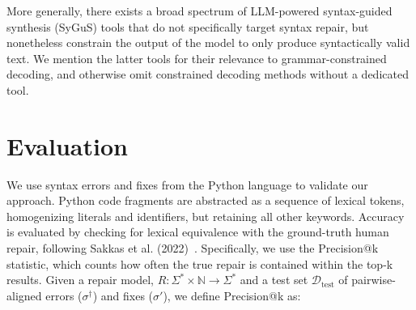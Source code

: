 \documentclass[runningheads]{llncs}
\newcommand{\cmark}{\ding{51}}%
\newcommand{\xmark}{\ding{55}}%
\begin{document}
More generally, there exists a broad spectrum of LLM-powered syntax-guided synthesis (SyGuS) tools that do not specifically target syntax repair, but nonetheless constrain the output of the model to only produce syntactically valid text. We mention the latter tools for their relevance to grammar-constrained decoding, and otherwise omit constrained decoding methods without a dedicated tool.

%


%
%
%

\section{Evaluation}

We use syntax errors and fixes from the Python language to validate our approach. Python code fragments are abstracted as a sequence of lexical tokens, homogenizing literals and identifiers, but retaining all other keywords. Accuracy is evaluated by checking for lexical equivalence with the ground-truth human repair, following Sakkas et al. (2022)~\cite{sakkas2022seq2parse}. Specifically, we use the Precision@k statistic, which counts how often the true repair is contained within the top-k results. Given a repair model, $R: \Sigma^* \times \mathbb{N} \rightarrow \Sigma^*$ and a test set $\mathcal{D}_{\text{test}}$ of pairwise-aligned errors ($\sigma^\dagger$) and fixes ($\sigma'$), we define Precision@k as:
\end{document}
